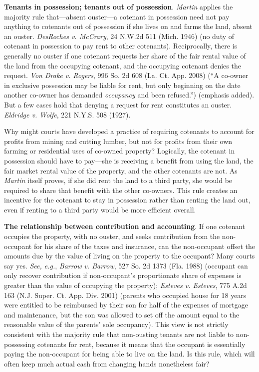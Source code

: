 \item \textbf{Tenants in possession; tenants out of possession}. \textit{Martin}
applies the majority rule that---absent ouster---a cotenant in possession need
not pay anything to cotenants out of possession if she lives on and farms the
land, absent an ouster. \emph{DesRoches v. McCrary}, 24 N.W.2d 511 (Mich. 1946)
(no duty of cotenant in possession to pay rent to other cotenants).
Reciprocally, there is generally no ouster if one cotenant requests her share of
the fair rental value of the land from the occupying cotenant, and the occupying
cotenant denies the request. \emph{Von Drake v. Rogers}, 996 So. 2d 608 (La. Ct.
App. 2008) (``A co-owner in exclusive possession may be liable for rent, but
only beginning on the date another co-owner has demanded \textit{occupancy} and
been refused.'') (emphasis added). But a few cases hold that denying a request
for rent constitutes an ouster. \emph{Eldridge v. Wolfe}, 221 N.Y.S. 508 (1927).

Why might courts have developed a practice of requiring cotenants to account for
profits from mining and cutting lumber, but not for profits from their own
farming or residential uses of co-owned property? Logically, the cotenant in
possession should have to pay---she is receiving a benefit from using the
land, the fair market rental value of the property, and the other cotenants are
not. As \textit{Martin} itself proves, if she did rent the land to a third
party, she would be required to share that benefit with the other co-owners.
This rule creates an incentive for the cotenant to stay in possession rather
than renting the land out, even if renting to a third party would be more
efficient overall.


\item \textbf{The relationship between contribution and accounting}. If one
cotenant occupies the property, with no ouster, and seeks contribution from the
non-occupant for his share of the taxes and insurance, can the non-occupant
offset the amounts due by the value of living on the property to the occupant?
Many courts say yes. \emph{See, e.g.}, \emph{Barrow v. Barrow}, 527 So. 2d 1373
(Fla. 1988) (occupant can only recover contribution if non-occupant's
proportionate share of expenses is greater than the value of occupying the
property); \emph{Esteves v. Esteves}, 775 A.2d 163 (N.J. Super. Ct. App. Div.
2001) (parents who occupied house for 18 years were entitled to be reimbursed by
their son for half of the expenses of mortgage and maintenance, but the son was
allowed to set off the amount equal to the reasonable value of the parents' sole
occupancy). This view is not strictly consistent with the majority rule that
non-ousting tenants are not liable to non-possessing cotenants for rent, because
it means that the occupant is essentially paying the non-occupant for being able
to live on the land. Is this rule, which will often keep much actual cash from
changing hands nonetheless fair?

